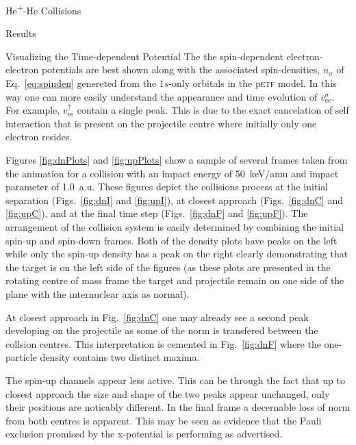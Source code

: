 \documentclass[letterpaper, 11 pt]{report}
\begin{document}
\begin{chapter}{\texorpdfstring{He\textsuperscript{+}}{He+}-He Collisions \label{chap:hephe}}
\begin{section}{Results \label{sec:hephe-disc}}
\begin{subsection}{Visualizing the Time-dependent Potential \label{sec:visual}}
         The the spin-dependent electron-electron potentials are best shown along with the associated
         spin-densities, $n_\sigma$ of Eq.~\eqref{eq:spinden} genereted from the $1s$-only orbitals in
         the p\textsc{etf} model. In this way one can more easily understand the appearance and time
         evolution of $v_\mathrm{ee}^\sigma$. For example, $v_\mathrm{ee}^\uparrow$ contain a single
         peak. This is due to the exact cancelation of self interaction that is present on the
         projectile centre where initially only one electron resides.

         Figures \ref{fig:dnPlots} and \ref{fig:upPlots} show a sample of several frames taken from the
         animation for a collision with an impact energy of 50~keV/amu and impact parameter of 1.0~a.u.
         These figures depict the collisions process at the initial separation (Figs.~\ref{fig:dnI} and
         \ref{fig:upI}), at closest approach (Figs.~\ref{fig:dnC} and \ref{fig:upC}), and at the final
         time step (Figs.~\ref{fig:dnF} and \ref{fig:upF}). The arrangement of the collision system is
         easily determined by combining the initial spin-up and spin-down frames. Both of the density
         plots have peaks on the left while only the spin-up density has a peak on the right clearly
         demonstrating that the target is on the left side of the figures (as these plots are presented
         in the rotating centre of mass frame the target and projectile remain on one side of the plane
         with the internuclear axis as normal).

         At closest approach in Fig.~\ref{fig:dnC} one may already see a
         second peak developing on the projectile as some of the norm is transfered between the collsion
         centres. This interpretation is cemented in Fig.~\ref{fig:dnF} where the one-particle density
         contains two distinct maxima.

         The spin-up channels appear less active. This can be through the fact that up to closest
         approach the size and shape of the two peaks appear unchanged, only their positions are
         noticably different. In the final frame a decernable loss of norm from both centres is
         apparent. This may be seen as evidence that the Pauli exclusion promised by the x-potential is
         performing as advertised.

         \FloatBarrier

      \end{subsection}


\end{section}
\end{chapter}
\end{document}
